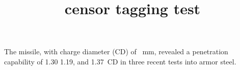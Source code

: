 \documentclass{article}
\title{censor tagging test}
\begin{document}
The  missile, with charge diameter (CD) of
~mm, revealed a penetration capability of 1.30
1.19, and 1.37~CD in three recent tests into armor steel.
\end{document}
